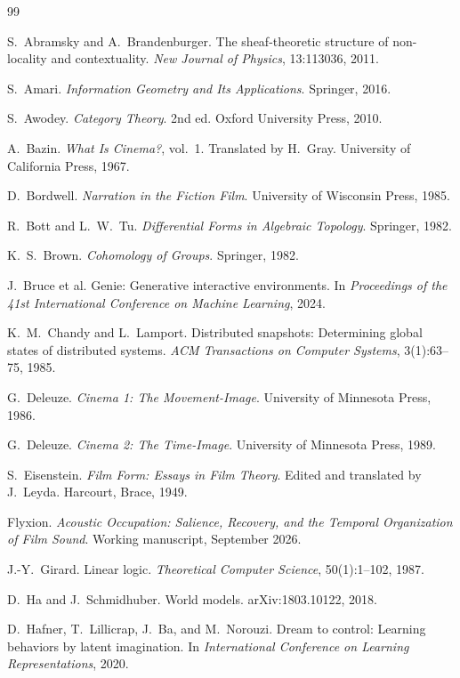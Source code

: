\begin{thebibliography}{99}

 S.~Abramsky and A.~Brandenburger. The sheaf-theoretic structure of non-locality and contextuality. \emph{New Journal of Physics}, 13:113036, 2011.

 S.~Amari. \emph{Information Geometry and Its Applications}. Springer, 2016.

 S.~Awodey. \emph{Category Theory}. 2nd ed. Oxford University Press, 2010.

 A.~Bazin. \emph{What Is Cinema?}, vol.~1. Translated by H.~Gray. University of California Press, 1967.

 D.~Bordwell. \emph{Narration in the Fiction Film}. University of Wisconsin Press, 1985.

 R.~Bott and L.~W.~Tu. \emph{Differential Forms in Algebraic Topology}. Springer, 1982.

 K.~S.~Brown. \emph{Cohomology of Groups}. Springer, 1982.

 J.~Bruce et al. Genie: Generative interactive environments. In \emph{Proceedings of the 41st International Conference on Machine Learning}, 2024.

 K.~M.~Chandy and L.~Lamport. Distributed snapshots: Determining global states of distributed systems. \emph{ACM Transactions on Computer Systems}, 3(1):63--75, 1985.

 G.~Deleuze. \emph{Cinema 1: The Movement-Image}. University of Minnesota Press, 1986.

 G.~Deleuze. \emph{Cinema 2: The Time-Image}. University of Minnesota Press, 1989.

 S.~Eisenstein. \emph{Film Form: Essays in Film Theory}. Edited and translated by J.~Leyda. Harcourt, Brace, 1949.

 Flyxion. \emph{Acoustic Occupation: Salience, Recovery, and the Temporal Organization of Film Sound}. Working manuscript, September 2026.

 J.-Y.~Girard. Linear logic. \emph{Theoretical Computer Science}, 50(1):1--102, 1987.

 D.~Ha and J.~Schmidhuber. World models. arXiv:1803.10122, 2018.

 D.~Hafner, T.~Lillicrap, J.~Ba, and M.~Norouzi. Dream to control: Learning behaviors by latent imagination. In \emph{International Conference on Learning Representations}, 2020.


\end{thebibliography}
